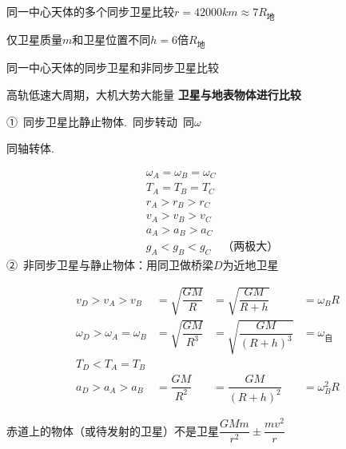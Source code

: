 同一中心天体的多个同步卫星比较\hfill $r=42000\unit{km}\approx7R_{\text{地}}$

\hspace*{2em}仅卫星质量$m$和卫星位置不同\hfill $h=6$倍$R_{\text{地}}$

同一中心天体的同步卫星和非同步卫星比较

\hspace*{4em}高轨低速大周期，大机大势大能量
\textbf{卫星与地表物体进行比较}

①\ 同步卫星比静止物体.\ 同步转动\ 同$\omega$

同轴转体.%


\[
\begin{aligned}
&\omega_A=\omega_B=\omega_C\\
&T_A=T_B=T_C\\
&r_A>r_B>r_C\\
&v_A>v_B>v_C\\
&a_A>a_B>a_C\\
&g_A<g_B<g_C\quad\text{（两极大）}
\end{aligned}
\]
②\ 非同步卫星与静止物体：用同卫做桥梁\quad $D$为近地卫星%

\[
\begin{array}{llll}
v_D>v_A>v_B & =\sqrt{\dfrac{GM}{R}} & =\sqrt{\dfrac{GM}{R+h}} & =\omega_BR\\[8pt]
\omega_D>\omega_A=\omega_B & =\sqrt{\dfrac{GM}{R^{3}}} & =\sqrt{\dfrac{GM}{(R+h)^{3}}} & =\omega_{\text{自}}\\[8pt]
T_D<T_A=T_B & & & \\[4pt]
a_D>a_A>a_B & =\dfrac{GM}{R^{2}} & =\dfrac{GM}{(R+h)^{2}} & =\omega_B^{2}R
\end{array}
\]


赤道上的物体（或待发射的卫星）不是卫星\quad $\dfrac{GMm}{r^{2}}\pm\dfrac{mv^{2}}{r}$

